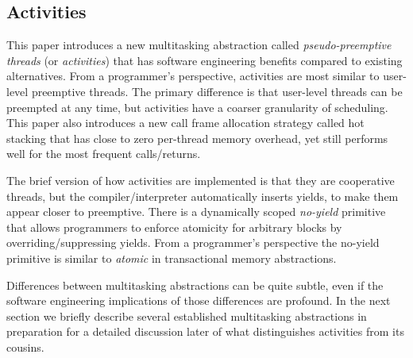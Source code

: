 \documentclass[9pt,preprint]{sigplanconf-2}
\begin{document}


\subsection{Activities}

This paper introduces a new multitasking abstraction called \emph{pseudo-preemptive threads} (or \emph{activities}) that has software engineering benefits compared to existing alternatives.
From a programmer's perspective, activities are most similar to user-level preemptive threads.
The primary difference is that user-level threads can be preempted at any time, but activities have a coarser granularity of scheduling.
This paper also introduces a new call frame allocation strategy called hot stacking that has close to zero per-thread memory overhead, yet still performs well for the most frequent calls/returns.

The brief version of how activities are implemented is that they are cooperative threads, but the compiler/interpreter automatically inserts yields, to make them appear closer to preemptive.
There is a dynamically scoped \emph{no-yield} primitive that allows programmers to enforce atomicity for arbitrary blocks by overriding/suppressing yields.
From a programmer's perspective the no-yield primitive is similar to \emph{atomic} in transactional memory abstractions.

Differences between multitasking abstractions can be quite subtle, even if the software engineering implications of those differences are profound.
In the next section we briefly describe several established multitasking abstractions in preparation for a detailed discussion later of what distinguishes activities from its cousins.
\end{document}

